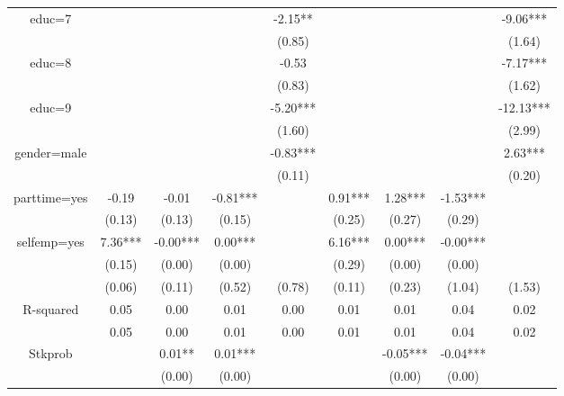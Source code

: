 \begin{table}[ht]
\begin{adjustbox}{width={0.9\textwidth},totalheight={\textheight}}
\begin{threeparttable}
\begin{tabular}{ccccccccc}
educ=7       &          &           &            &     -2.15** &           &            &             &     -9.06*** \\
             &          &           &            &      (0.85) &           &            &             &       (1.64) \\
educ=8       &          &           &            &       -0.53 &           &            &             &     -7.17*** \\
             &          &           &            &      (0.83) &           &            &             &       (1.62) \\
educ=9       &          &           &            &    -5.20*** &           &            &             &    -12.13*** \\
             &          &           &            &      (1.60) &           &            &             &       (2.99) \\
gender=male  &          &           &            &    -0.83*** &           &            &             &      2.63*** \\
             &          &           &            &      (0.11) &           &            &             &       (0.20) \\
parttime=yes &    -0.19 &     -0.01 &   -0.81*** &             &   0.91*** &    1.28*** &    -1.53*** &              \\
             &   (0.13) &    (0.13) &     (0.15) &             &    (0.25) &     (0.27) &      (0.29) &              \\
selfemp=yes  &  7.36*** &  -0.00*** &    0.00*** &             &   6.16*** &    0.00*** &    -0.00*** &              \\
             &   (0.15) &    (0.00) &     (0.00) &             &    (0.29) &     (0.00) &      (0.00) &              \\
             &   (0.06) &    (0.11) &     (0.52) &      (0.78) &    (0.11) &     (0.23) &      (1.04) &       (1.53) \\
R-squared    &     0.05 &      0.00 &       0.01 &        0.00 &      0.01 &       0.01 &        0.04 &         0.02 \\
             &     0.05 &      0.00 &       0.01 &        0.00 &      0.01 &       0.01 &        0.04 &         0.02 \\
Stkprob      &          &    0.01** &    0.01*** &             &           &   -0.05*** &    -0.04*** &              \\
             &          &    (0.00) &     (0.00) &             &           &     (0.00) &      (0.00) &              \\

\end{tabular}
\end{threeparttable}
\end{adjustbox}
\end{table}
